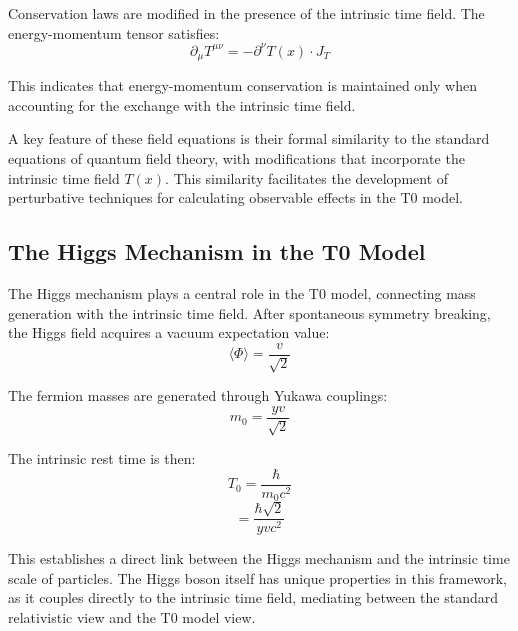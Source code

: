\documentclass[12pt,a4paper]{article} %
\newcommand{\Tfield}{T(x)}
\newcommand{\Tzero}{T_0}
\begin{document}
	Conservation laws are modified in the presence of the intrinsic time field. 
	The energy-momentum tensor satisfies:
	\begin{equation}
		\partial_{\mu}T^{\mu\nu} = -\partial^{\nu}\Tfield \cdot J_T
		\label{eq:em_conservation}
	\end{equation}
	
	This indicates that energy-momentum conservation is maintained
	only when accounting for the exchange with the intrinsic time field.
	
	A key feature of these field equations
	is their formal similarity to the standard equations of quantum field theory,
	with modifications that incorporate the intrinsic time field $\Tfield$. 
	This similarity facilitates the development of perturbative techniques
	for calculating observable effects in the T0 model.
	
	\subsection{The Higgs Mechanism in the T0 Model}
	\label{subsec:higgs_mechanism}
	
	The Higgs mechanism plays a central role in the T0 model,
	connecting mass generation with the intrinsic time field. 
	After spontaneous symmetry breaking,
	the Higgs field acquires a vacuum expectation value:
	\begin{equation}
		\langle\Phi\rangle = \frac{v}{\sqrt{2}}
		\label{eq:higgs_vev}
	\end{equation}
	
	The fermion masses are generated through Yukawa couplings:
	\begin{equation}
		m_0 = \frac{yv}{\sqrt{2}}
		\label{eq:fermion_mass}
	\end{equation}
	
	The intrinsic rest time is then:
	\begin{equation}
		\Tzero = \frac{\hbar}{m_0c^2}
		\label{eq:rest_time_higgs_part1}
	\end{equation}
	\begin{equation}
		= \frac{\hbar\sqrt{2}}{yvc^2}
		\label{eq:rest_time_higgs_part2}
	\end{equation}
	
	This establishes a direct link between the Higgs mechanism
	and the intrinsic time scale of particles. 
	The Higgs boson itself has unique properties in this framework,
	as it couples directly to the intrinsic time field,
	mediating between the standard relativistic view and the T0 model view.
	
\end{document}
